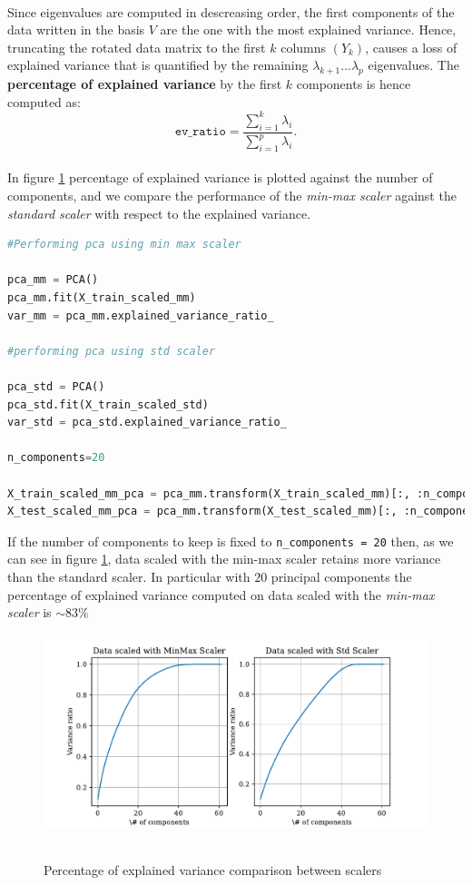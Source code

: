 \\
Since eigenvalues are computed in descreasing order, the first components of the data written in the basis \(V\) are the one with the most explained variance. Hence, truncating the rotated data matrix to the first \(k\) columns \((Y_k)\), causes a loss of explained variance that is quantified by the remaining \(\lambda_{k+ 1}\dots \lambda_p\) eigenvalues. The \textbf{percentage of explained variance} by the first \(k\) components is hence computed as:
\begin{equation}
     \texttt{ev\_ratio} = \frac{\sum \limits_{i= 1}^{k} \lambda_i}{\sum \limits_{i= 1}^{p} \lambda_i}. 
\end{equation}
\\
In figure \ref{fig_PCA} percentage of explained variance is plotted against the number of components, and we compare the performance of the \textit{min-max scaler} against the \textit{standard scaler} with respect to the explained variance.

\begin{lstlisting}[language=Python, caption= Data scaling]
#Performing pca using min max scaler

pca_mm = PCA()
pca_mm.fit(X_train_scaled_mm)
var_mm = pca_mm.explained_variance_ratio_

#performing pca using std scaler

pca_std = PCA()
pca_std.fit(X_train_scaled_std)
var_std = pca_std.explained_variance_ratio_

n_components=20

X_train_scaled_mm_pca = pca_mm.transform(X_train_scaled_mm)[:, :n_components]
X_test_scaled_mm_pca = pca_mm.transform(X_test_scaled_mm)[:, :n_components]
\end{lstlisting}
If the number of components to keep is fixed to \texttt{n\_components = 20} then, as we can see in figure \ref{fig_PCA}, data scaled with the min-max scaler retains more variance than the standard scaler. In particular with \(20\) principal components the percentage of explained variance computed on data scaled with the \textit{min-max scaler} is \(\sim 83\%\)
\begin{figure}[htb]
    \centering
    \includegraphics[scale=0.7]{pictures/variance_ratio_PCA.pdf}\
    \caption{Percentage of explained variance comparison between scalers}
    \label{fig_PCA}
\end{figure}